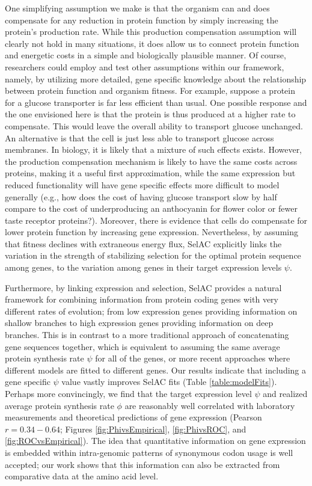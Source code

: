 \documentclass[12pt,letterpaper,fleqn]{article}
\newcommand{\selac}{SelAC\xspace}
\begin{document}
One simplifying assumption we make is that the organism can and does compensate for any reduction in protein function by simply increasing the protein's production rate.
While this production compensation assumption will clearly not hold in many situations, it does allow us to connect protein function and energetic costs in a simple and biologically plausible manner.
Of course, researchers could employ and test other assumptions within our framework, namely, by utilizing more detailed, gene specific knowledge about the relationship between protein function and organism fitness.
For example, suppose a protein for a glucose transporter is far less efficient than usual.
One possible response and the one envisioned here is that the protein is thus produced at a higher rate to compensate.
This would leave the overall ability to transport glucose unchanged.
An alternative is that the cell is just less able to transport glucose across membranes.
In biology, it is likely that a mixture of such effects exists.
However, the production compensation mechanism is likely to have the same costs across proteins, making it a useful first approximation, while the same expression but reduced functionality will have gene specific effects more difficult to model generally (e.g., how does the cost of having glucose transport slow by half compare to the cost of underproducing an anthocyanin for flower color or fewer taste receptor proteins?).
Moreover, there is evidence that cells do compensate for lower protein function by increasing gene expression.
Nevertheless, by assuming that fitness declines with extraneous energy flux, \selac explicitly links the variation in the strength of stabilizing selection for the optimal protein sequence among genes, to the variation among genes in their target expression levels $\psi$.

Furthermore, by linking expression and selection, \selac provides a natural framework for combining information from protein coding genes with very different rates of evolution; from low expression genes providing information on shallow branches to high expression genes providing information on deep branches.
This is in contrast to a more traditional approach of concatenating gene sequences together, which is equivalent to assuming the same average protein synthesis rate $\psi$ for all of the genes, or more recent approaches where different models are fitted to different genes.
Our results indicate that including a gene specific $\psi$ value vastly improves \selac fits (Table \ref{table:modelFits}).
Perhaps more convincingly, we find that the target expression level $\psi$ and realized average protein synthesis rate $\phi$ are reasonably well correlated with laboratory measurements and theoretical predictions of gene expression (Pearson $r= 0.34-0.64$; Figures \ref{fig:PhivsEmpirical}, \ref{fig:PhivsROC}, and \ref{fig:ROCvsEmpirical}).
The idea that quantitative information on gene expression is embedded within intra-genomic patterns of synonymous codon usage is well accepted; our work shows that this information can also be extracted from comparative data at the amino acid level.
\end{document}
